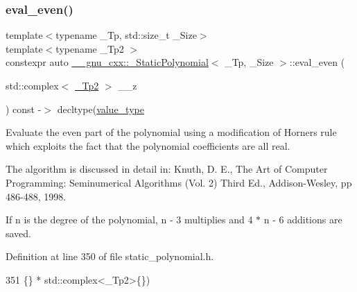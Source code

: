 \subsubsection{\texorpdfstring{eval\+\_\+even()}{eval\_even()}\hspace{0.1cm}{\footnotesize\ttfamily [2/2]}}
{\footnotesize\ttfamily template$<$typename \+\_\+\+Tp, std\+::size\+\_\+t \+\_\+\+Size$>$ \\
template$<$typename \+\_\+\+Tp2 $>$ \\
constexpr auto \hyperlink{class____gnu__cxx_1_1__StaticPolynomial}{\+\_\+\+\_\+gnu\+\_\+cxx\+::\+\_\+\+Static\+Polynomial}$<$ \+\_\+\+Tp, \+\_\+\+Size $>$\+::eval\+\_\+even (\begin{DoxyParamCaption}\item[{std\+::complex$<$ \hyperlink{class____gnu__cxx_1_1__StaticPolynomial_a688f26b7c706701416fad299240aa856}{\+\_\+\+Tp2} $>$}]{\+\_\+\+\_\+z }\end{DoxyParamCaption}) const -\/$>$ decltype(\hyperlink{class____gnu__cxx_1_1__StaticPolynomial_aad5f3d6d5876b6926b30724aeac649d6}{value\+\_\+type}\hspace{0.3cm}{\ttfamily [inline]}}

Evaluate the even part of the polynomial using a modification of Horner\textquotesingle{}s rule which exploits the fact that the polynomial coefficients are all real.

The algorithm is discussed in detail in\+: Knuth, D. E., The Art of Computer Programming\+: Seminumerical Algorithms (Vol. 2) Third Ed., Addison-\/\+Wesley, pp 486-\/488, 1998.

If n is the degree of the polynomial, n -\/ 3 multiplies and 4 $\ast$ n -\/ 6 additions are saved. 

Definition at line 350 of file static\+\_\+polynomial.\+h.


\begin{DoxyCode}
351                               \{\} * std::complex<\_Tp2>\{\})
\end{DoxyCode}
\mbox{\label{class____gnu__cxx_1_1__StaticPolynomial_a2412b3220116a5721b770a8eef3b5dd8}} 
